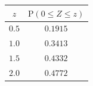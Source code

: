 {\setlength{\tabcolsep}{8pt}\renewcommand{\arraystretch}{1.35}%
\begin{tabular}{|c|c|}
\hline
$z$ & $\mathrm{P}(0\le Z\le z)$ \\
\hline
$0.5$ & $0.1915$ \\
\hline
$1.0$ & $0.3413$ \\
\hline
$1.5$ & $0.4332$ \\
\hline
$2.0$ & $0.4772$ \\
\hline
\end{tabular}}
